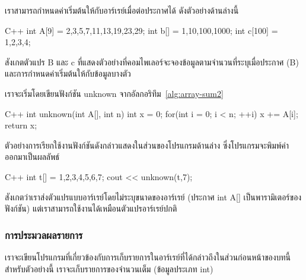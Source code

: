 เรา{\wbr}สามารถ{\wbr}กำหนด{\wbr}ค่า{\wbr}เริ่มต้น{\wbr}ให้{\wbr}กับ{\wbr}อาร์เรย์{\wbr}เมื่อ{\wbr}ต่อ{\wbr}ประกาศ{\wbr}ได้ ดัง{\wbr}ตัวอย่าง{\wbr}ด้าน{\wbr}ล่าง{\wbr}นี้{\wbr}
\latintext
\begin{codelist}{C++}{}
  int A[9] = {2,3,5,7,11,13,19,23,29};
  int b[] = {1,10,100,1000};
  int c[100] = {1,2,3,4};
\end{codelist}
\thaitext

สังเกต{\wbr}ตัวแปร {\ct B} และ {\ct c}
ที่{\wbr}แสดง{\wbr}ตัวอย่าง{\wbr}ที่{\wbr}คอม{\wbr}ไพ{\wbr}เลอร์{\wbr}จะ{\wbr}จอง{\wbr}ข้อมูล{\wbr}ตาม{\wbr}จำนวน{\wbr}ที่{\wbr}ระบุ{\wbr}เมื่อ{\wbr}ประกาศ ({\ct B})
และ{\wbr}การ{\wbr}กำหนด{\wbr}ค่า{\wbr}เริ่มต้น{\wbr}ให้{\wbr}กับ{\wbr}ข้อมูล{\wbr}บาง{\wbr}ตัว{\wbr}

เรา{\wbr}จะ{\wbr}เริ่ม{\wbr}โดย{\wbr}เขียน{\wbr}ฟังก์ชัน {\ct unknown} จาก{\wbr}อัล{\wbr}กอ{\wbr}ริ{\wbr}ทึม~\ref{alg:array-sum2}

\latintext
\begin{codelist}{C++}{}
int unknown(int A[], int n)
{
  int x = 0;
  for(int i = 0; i < n; ++i)
    x += A[i];
  return x;
}
\end{codelist}
\thaitext

ตัวอย่าง{\wbr}การ{\wbr}เรียก{\wbr}ใช้{\wbr}งาน{\wbr}ฟังก์ชัน{\wbr}ดังกล่าว{\wbr}แสดง{\wbr}ใน{\wbr}ส่วน{\wbr}ของ{\wbr}โปรแกรม{\wbr}ด้าน{\wbr}ล่าง{\wbr}
ซึ่ง{\wbr}โปรแกรม{\wbr}จะ{\wbr}พิมพ์{\wbr}ค่า {} ออก{\wbr}มา{\wbr}เป็น{\wbr}ผลลัพธ์{\wbr}

\latintext
\begin{codelist}{C++}{}
  int t[] = {1,2,3,4,5,6,7};
  cout << unknown(t,7);
\end{codelist}
\thaitext
 
สังเกต{\wbr}ว่า{\wbr}เรา{\wbr}ส่ง{\wbr}ตัวแปร{\wbr}แบบ{\wbr}อาร์เรย์{\wbr}โดย{\wbr}ไม่{\wbr}ระบุ{\wbr}ขนาด{\wbr}ของ{\wbr}อาร์เรย์ (ประกาศ {\ct int A[]}
เป็น{\wbr}พารามิเตอร์{\wbr}ของ{\wbr}ฟังก์ชัน) แต่{\wbr}เรา{\wbr}สามารถ{\wbr}ใช้{\wbr}งาน{\wbr}ได้{\wbr}เหมือน{\wbr}ตัวแปร{\wbr}อาร์เรย์{\wbr}ปกติ{\wbr}

\subsubsection{การ{\wbr}ประมวลผล{\wbr}รายการ}

เรา{\wbr}จะ{\wbr}เขียน{\wbr}โปรแกรม{\wbr}ที่{\wbr}เกี่ยวข้อง{\wbr}กับ{\wbr}การ{\wbr}เก็บ{\wbr}รายการ{\wbr}ใน{\wbr}อาร์เรย์{\wbr}ที่{\wbr}ได้{\wbr}กล่าว{\wbr}ถึง{\wbr}ใน{\wbr}ส่วน{\wbr}ก่อนหน้า{\wbr}ของ{\wbr}บท{\wbr}นี้{\wbr}
สำหรับ{\wbr}ตัวอย่าง{\wbr}นี้ เรา{\wbr}จะ{\wbr}เก็บ{\wbr}รายการ{\wbr}ของ{\wbr}จำนวนเต็ม (ข้อมูล{\wbr}ประเภท {\ct int})

